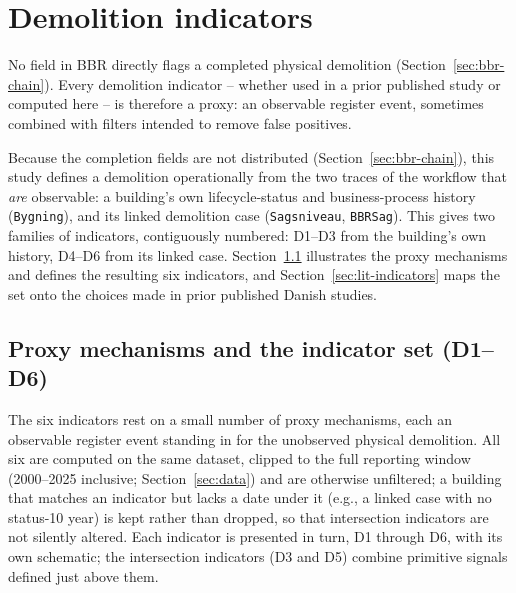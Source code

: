 \section{Demolition indicators}\label{sec:indicators}

No field in BBR directly flags a completed physical demolition
(Section~\ref{sec:bbr-chain}). Every demolition indicator -- whether used
in a prior published study or computed here -- is therefore a proxy: an
observable register event, sometimes combined with filters intended to
remove false positives.

Because the completion fields are not distributed
(Section~\ref{sec:bbr-chain}), this study defines a demolition
operationally from the two traces of the workflow that \emph{are}
observable: a building's own lifecycle-status and business-process
history (\texttt{Bygning}), and its linked demolition case
(\texttt{Sagsniveau}, \texttt{BBRSag}). This gives two families of
indicators, contiguously numbered: D1--D3 from the building's own
history, D4--D6 from its linked case. Section~\ref{sec:ind-set}
illustrates the proxy mechanisms and defines the resulting six indicators,
and Section~\ref{sec:lit-indicators} maps the set onto the choices made
in prior published Danish studies.

\subsection{Proxy mechanisms and the indicator set (D1--D6)}\label{sec:ind-set}

The six indicators rest on a small number of proxy mechanisms, each an
observable register event standing in for the unobserved physical demolition.
All six are computed on the same dataset, clipped to the full reporting
window (2000--2025 inclusive; Section~\ref{sec:data}) and are otherwise
unfiltered; a building that matches an indicator but lacks a date under
it (e.g., a linked case with no status-10 year) is kept rather than
dropped, so that intersection indicators are not silently altered. Each
indicator is presented in turn, D1 through D6, with its own schematic;
the intersection indicators (D3 and D5) combine primitive signals
defined just above them.

